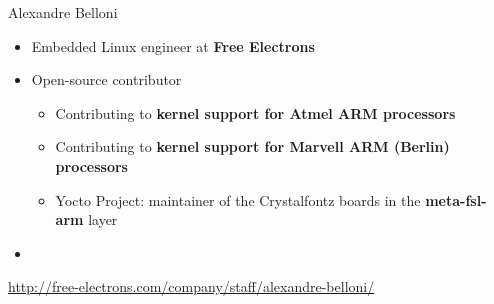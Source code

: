 \begin{frame}{Alexandre Belloni}
    \begin{itemize}
      \item Embedded Linux engineer at {\bf Free Electrons}
      \item Open-source contributor
        \begin{itemize}
          \item Contributing to {\bf kernel support for Atmel ARM
            processors}
          \item Contributing to {\bf kernel support for Marvell
            ARM (Berlin) processors}
          \item Yocto Project: maintainer of the Crystalfontz boards
            in the {\bf meta-fsl-arm} layer
        \end{itemize}
      \item {}
    \end{itemize}
    {\small \url{http://free-electrons.com/company/staff/alexandre-belloni/}}
\end{frame}

